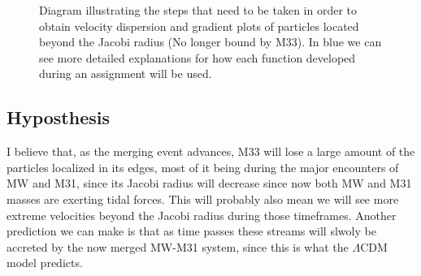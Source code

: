 \documentclass[linenumbers,trackchanges]{aastex7}
\begin{document}
\begin{figure*}[h!]
\caption{Diagram illustrating the steps that need to be taken in order to obtain velocity dispersion and gradient plots of particles located beyond the Jacobi radius (No longer bound by M33). In blue we can see more detailed explanations for how each function developed during an assignment will be used.
\label{fig:general2}}
\end{figure*}



\subsection{Hyposthesis}

I believe that, as the merging event advances, M33 will lose a large amount of the particles localized in its edges, most of it being during the major encounters of MW and M31, since its Jacobi radius will decrease since now both MW and M31 masses are exerting tidal forces. This will probably also mean we will see more extreme velocities beyond the Jacobi radius during those timeframes. Another prediction we can make is that as time passes these streams will slwoly be accreted by the now merged MW-M31 system, since this is what the $\Lambda$CDM model predicts.

\newpage
{}



\end{document}
